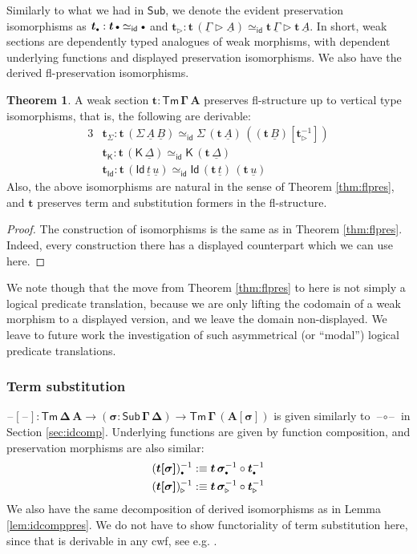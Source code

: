 \documentclass[12pt,a4paper,twoside,openany]{book}
\theoremstyle{remark}
\theoremstyle{definition}
\theoremstyle{theorem}
\newtheorem{theorem}{Theorem}
\newcommand{\bs}[1]{\boldsymbol{#1}}
\newcommand{\id}{\mathsf{id}}
\newcommand{\Sub}{\mathsf{Sub}}
\newcommand{\Tm}{\mathsf{Tm}}
\newcommand{\Id}{\mathsf{Id}}
\newcommand{\blank}{\mathord{\hspace{1pt}\text{--}\hspace{1pt}}}
\newcommand{\ra}{\rightarrow}
\newcommand{\ext}{\triangleright}
\newcommand{\emptycon}{\scaleobj{.75}\bullet}
\newcommand{\K}{\mathsf{K}}
\newcommand{\bSub}{\bs{\Sub}}
\newcommand{\bsigma}{\bs{\sigma}}
\newcommand{\bt}{\bs{t}}
\newcommand{\ul}[1]{\underline{#1}}
\newcommand{\ulGamma}{\ul{\Gamma}}
\newcommand{\ulDelta}{\ul{\Delta}}
\newcommand{\ult}{\ul{t}}
\newcommand{\ulu}{\ul{u}}
\newcommand{\ulA}{\ul{A}}
\newcommand{\ulB}{\ul{B}}
\newcommand{\defn}{:\equiv}
\begin{document}
Similarly to what we had in $\bSub$, we denote the evident preservation
isomorphisms as $\bt_{\emptycon} : \bt\,\emptycon \simeq_{\id} \emptycon$ and
$\bt_{\ext} : \bt\,(\ulGamma\ext \ulA) \simeq_{\id} \bt\,\ulGamma \ext
\bt\,\ulA$. In short, weak sections are dependently typed analogues of weak
morphisms, with dependent underlying functions and displayed preservation
isomorphisms. We also have the derived fl-preservation isomorphisms.

\begin{theorem} A weak section $\bs{t : \Tm\,\Gamma\,A}$ preserves fl-structure up to vertical type isomorphisms, that is, the following are derivable:
\begin{alignat*}{3}
  & \bt_{\Sigma} : \bt\,(\Sigma\,\ulA\,\ulB) \simeq_{\id} \Sigma\,(\bt\,\ulA)\,((\bt\,\ulB)[\bt_{\ext}^{-1}]) \\
  & \bt_{\K} : \bt\,(\K\,\ulDelta) \simeq_{\id} \K\,(\bt\,\ulDelta) \\
  & \bt_{\Id} : \bt\,(\Id\,\ult\,\ulu) \simeq_{\id} \Id\,(\bt\,\ult)\,(\bt\,\ulu)
\end{alignat*}
Also, the above isomorphisms are natural in the sense of Theorem
\ref{thm:flpres}, and $\bt$ preserves term and substitution formers in the
fl-structure.
\end{theorem}
\begin{proof}
The construction of isomorphisms is the same as in Theorem
\ref{thm:flpres}. Indeed, every construction there has a displayed counterpart
which we can use here.
\end{proof}

We note though that the move from Theorem \ref{thm:flpres} to here is not simply a
logical predicate translation, because we are only lifting the codomain of a
weak morphism to a displayed version, and we leave the domain non-displayed. We
leave to future work the investigation of such asymmetrical (or
``modal'') logical predicate translations.



\subsubsection{Term substitution}

$\bs{\blank[\blank] : \Tm\,\Delta\,A \ra (\sigma : \Sub\,\Gamma\,\Delta)
  \ra \Tm\,\Gamma\,(A[\sigma])}$ is given similarly to
$\bs{\blank\!\circ\!\blank}$ in Section \ref{sec:idcomp}. Underlying functions
are given by function composition, and preservation morphisms are also similar:
\begin{alignat*}{3}
  & (\bs{t[\sigma]})_{\emptycon}^{-1} \defn
    \bt\,\bsigma_{\emptycon}^{-1} \circ \bt_{\emptycon}^{-1} \\
  & (\bs{t[\sigma]})_{\ext}^{-1} \defn
    \bt\,\bsigma_{\ext}^{-1} \circ \bt_{\ext}^{-1}
\end{alignat*}
We also have the same decomposition of derived isomorphisms as in Lemma
\ref{lem:idcomppres}. We do not have to show functoriality of term substitution
here, since that is derivable in any cwf, see e.g. \cite{kaposi2019constructing}.
\end{document}
